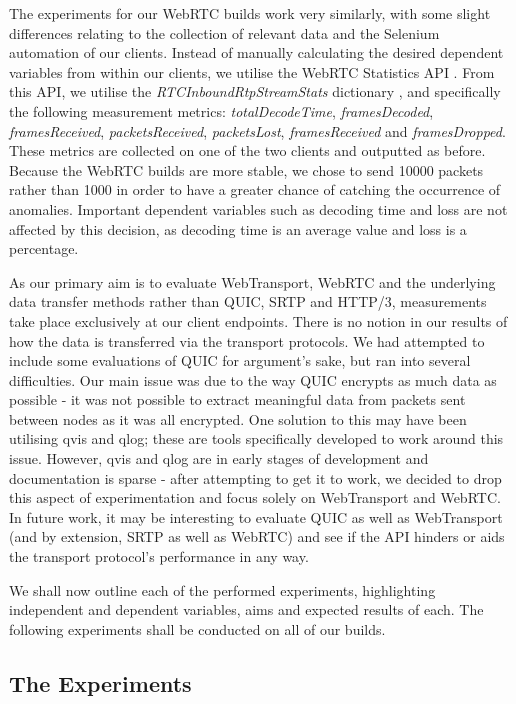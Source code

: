 The experiments for our WebRTC builds work very similarly, with some slight differences relating to the collection of relevant data and the Selenium automation of our clients. Instead of manually calculating the desired dependent variables from within our clients, we utilise the WebRTC Statistics API \cite{webrtc-stats-api}. From this API, we utilise the \textit{RTCInboundRtpStreamStats} dictionary \cite{webrtc-stats-api-inboundrtpstats}, and specifically the following measurement metrics: \textit{totalDecodeTime}, \textit{framesDecoded}, \textit{framesReceived},
\textit{packetsReceived}, \textit{packetsLost}, \textit{framesReceived} and \textit{framesDropped}. These metrics are collected on one of the two clients and outputted as before. Because the WebRTC builds are more stable, we chose to send 10000 packets rather than 1000 in order to have a greater chance of catching the occurrence of anomalies. Important dependent variables such as decoding time and loss are not affected by this decision, as decoding time is an average value and loss is a percentage.

As our primary aim is to evaluate WebTransport, WebRTC and the underlying data transfer methods rather than QUIC, SRTP and HTTP/3, measurements take place exclusively at our client endpoints. There is no notion in our results of how the data is transferred via the transport protocols. We had attempted to include some evaluations of QUIC for argument's sake, but ran into several difficulties. Our main issue was due to the way QUIC encrypts as much data as possible - it was not possible to extract meaningful data from packets sent between nodes as it was all encrypted. One solution to this may have been utilising qvis and qlog; these are tools specifically developed to work around this issue. However, qvis and qlog are in early stages of development and documentation is sparse - after attempting to get it to work, we decided to drop this aspect of experimentation and focus solely on WebTransport and WebRTC. In future work, it may be interesting to evaluate QUIC as well as WebTransport (and by extension, SRTP as well as WebRTC) and see if the API hinders or aids the transport protocol's performance in any way.

We shall now outline each of the performed experiments, highlighting independent and dependent variables, aims and expected results of each. The following experiments shall be conducted on all of our builds.

\subsection{The Experiments}

